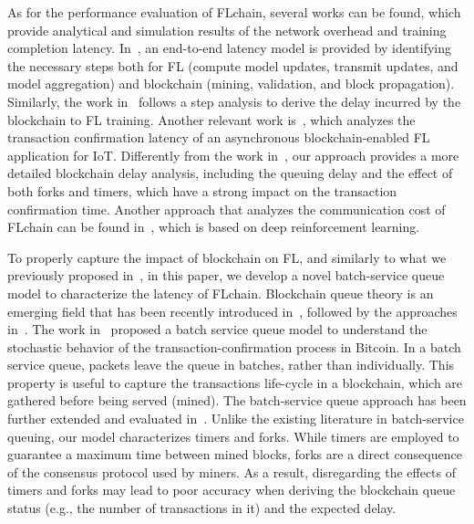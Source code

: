 \documentclass[lettersize,journal]{IEEEtran}
\begin{document}
As for the performance evaluation of FLchain, several works can be found, which provide analytical and simulation results of the network overhead and training completion latency. In~\cite{kim2019blockchained}, an end-to-end latency model is provided by identifying the necessary steps both for FL (compute model updates, transmit updates, and model aggregation) and blockchain (mining, validation, and block propagation). Similarly, the work in~\cite{pokhrel2020federated} follows a step analysis to derive the delay incurred by the blockchain to FL training. Another relevant work is~\cite{feng2021blockchain}, which analyzes the transaction confirmation latency of an asynchronous blockchain-enabled FL application for IoT. Differently from the work in~\cite{feng2021blockchain}, our approach provides a more detailed blockchain delay analysis, including the queuing delay and the effect of both forks and timers, which have a strong impact on the transaction confirmation time. Another approach that analyzes the communication cost of FLchain can be found in~\cite{lu2020low}, which is based on deep reinforcement learning.

To properly capture the impact of blockchain on FL, and similarly to what we previously proposed in~\cite{wilhelmi2021discrete}, in this paper, we develop a novel batch-service queue model to characterize the latency of FLchain. Blockchain queue theory is an emerging field that has been recently introduced in~\cite{kawase2017transaction}, followed by the approaches in~\cite{kawase2018batch, li2018blockchain, geissler2019discrete}. The work in~\cite{kawase2017transaction} proposed a batch service queue model to understand the stochastic behavior of the transaction-confirmation process in Bitcoin. In a batch service queue, packets leave the queue in batches, rather than individually. This property is useful to capture the transactions life-cycle in a blockchain, which are gathered before being served (mined). The batch-service queue approach has been further extended and evaluated in~\cite{kawase2018batch, li2018blockchain}. Unlike the existing literature in batch-service queuing, our model characterizes timers and forks. While timers are employed to guarantee a maximum time between mined blocks, forks are a direct consequence of the consensus protocol used by miners. As a result, disregarding the effects of timers and forks may lead to poor accuracy when deriving the blockchain queue status (e.g., the number of transactions in it) and the expected delay.

\end{document}
